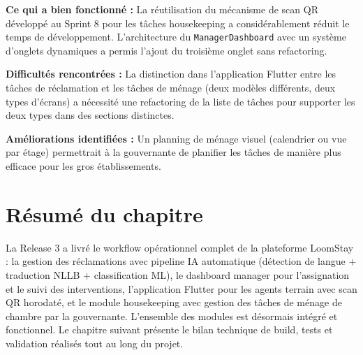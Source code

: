 \textbf{Ce qui a bien fonctionné :} La réutilisation du mécanisme de scan QR développé au Sprint 8 pour les tâches housekeeping a considérablement réduit le temps de développement. L'architecture du \texttt{ManagerDashboard} avec un système d'onglets dynamiques a permis l'ajout du troisième onglet sans refactoring.

\textbf{Difficultés rencontrées :} La distinction dans l'application Flutter entre les tâches de réclamation et les tâches de ménage (deux modèles différents, deux types d'écrans) a nécessité une refactoring de la liste de tâches pour supporter les deux types dans des sections distinctes.

\textbf{Améliorations identifiées :} Un planning de ménage visuel (calendrier ou vue par étage) permettrait à la gouvernante de planifier les tâches de manière plus efficace pour les gros établissements.

\section*{Résumé du chapitre}

La Release 3 a livré le workflow opérationnel complet de la plateforme LoomStay : la gestion des réclamations avec pipeline IA automatique (détection de langue + traduction NLLB + classification ML), le dashboard manager pour l'assignation et le suivi des interventions, l'application Flutter pour les agents terrain avec scan QR horodaté, et le module housekeeping avec gestion des tâches de ménage de chambre par la gouvernante. L'ensemble des modules est désormais intégré et fonctionnel. Le chapitre suivant présente le bilan technique de build, tests et validation réalisés tout au long du projet.

